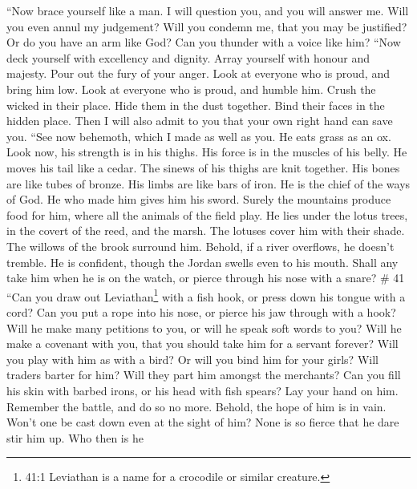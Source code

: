  ``Now brace yourself like a man. I will question you, and
you will answer me.  Will you even annul my judgement? Will
you condemn me, that you may be justified?  Or do you have
an arm like God? Can you thunder with a voice like him? 
``Now deck yourself with excellency and dignity. Array yourself with
honour and majesty.  Pour out the fury of your anger. Look
at everyone who is proud, and bring him low.  Look at
everyone who is proud, and humble him. Crush the wicked in their place.
 Hide them in the dust together. Bind their faces in the
hidden place.  Then I will also admit to you that your own
right hand can save you.  ``See now behemoth, which I made
as well as you. He eats grass as an ox.  Look now, his
strength is in his thighs. His force is in the muscles of his belly.
 He moves his tail like a cedar. The sinews of his thighs
are knit together.  His bones are like tubes of bronze. His
limbs are like bars of iron.  He is the chief of the ways
of God. He who made him gives him his sword.  Surely the
mountains produce food for him, where all the animals of the field play.
 He lies under the lotus trees, in the covert of the reed,
and the marsh.  The lotuses cover him with their shade. The
willows of the brook surround him.  Behold, if a river
overflows, he doesn't tremble. He is confident, though the Jordan swells
even to his mouth.  Shall any take him when he is on the
watch, or pierce through his nose with a snare? \# 41  ``Can
you draw out Leviathan\footnote{41:1 Leviathan is a name for a crocodile
  or similar creature.} with a fish hook, or press down his tongue with
a cord?  Can you put a rope into his nose, or pierce his jaw
through with a hook?  Will he make many petitions to you, or
will he speak soft words to you?  Will he make a covenant
with you, that you should take him for a servant forever? 
Will you play with him as with a bird? Or will you bind him for your
girls?  Will traders barter for him? Will they part him
amongst the merchants?  Can you fill his skin with barbed
irons, or his head with fish spears?  Lay your hand on him.
Remember the battle, and do so no more.  Behold, the hope of
him is in vain. Won't one be cast down even at the sight of him?
 None is so fierce that he dare stir him up. Who then is he
